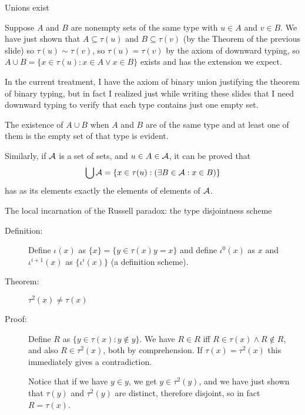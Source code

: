 \documentclass{slides}
\begin{document}
\begin{slide}

{\Large Unions exist}

Suppose $A$ and $B$ are nonempty sets of the same type with $u \in A$ and $v \in B$.  We have just shown that $A \subseteq \tau(u)$ and $B \subseteq \tau(v)$ (by the Theorem of the previous slide) so
$\tau(u) \sim \tau(v)$, so $\tau(u) = \tau(v)$ by the axiom of downward typing, so $A \cup B = \{x \in \tau(u):x \in A \vee x \in B\}$ exists and has the extension we expect.

In the current treatment, I have the axiom of binary union justifying the theorem of binary typing, but in fact I realized just while writing these slides that I need downward typing to verify that each type contains just one empty set.

The existence of $A \cup B$ when $A$ and $B$ are of the same type and at least one of them is the empty set of that type is evident.

Similarly, if $\cal A$ is a set of sets, and $u \in A \in \cal A$, it can be proved that $$\bigcup {\cal A} = \{x \in \tau(u):(\exists B \in {\cal A}:x \in B)\}$$ has as its elements exactly the elements of elements of $\cal A$.


\end{slide}

\begin{slide}

{\Large The local incarnation of the Russell paradox:  the type disjointness scheme}

\begin{description}

\item[Definition:]  Define $\iota(x)$ as $\{x\} = \{y \in \tau(x)y=x\}$ and define $\iota^0(x)$ as $x$ and $\iota^{i+1}(x)$ as $\{\iota^i(x)\}$ (a definition scheme).

\item[Theorem:]  $\tau^2(x) \neq \tau(x)$

\item[Proof:]  Define $R$ as $\{y \in \tau(x):y \not\in y\}$.  We have $R \in R$ iff $R \in \tau(x) \wedge R \not\in R$, and also $R \in \tau^2(x)$, both by comprehension.
If $\tau(x) = \tau^2(x)$ this immediately gives a contradiction.

Notice that if we have $y \in y$, we get $y \in \tau^2(y)$, and we have just shown that $\tau(y)$ and $\tau^2(y)$ are distinct, therefore disjoint, so in fact $R = \tau(x)$.

\end{description}


\end{slide}
\end{document}
